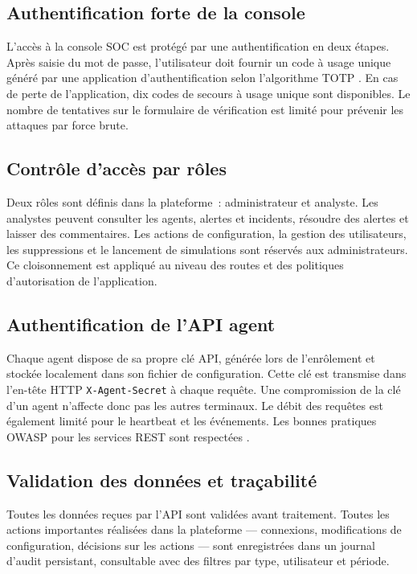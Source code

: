 \subsection{Authentification forte de la console}

L'accès à la console SOC est protégé par une authentification en deux étapes. Après saisie du mot de passe, l'utilisateur doit fournir un code à usage unique généré par une application d'authentification selon l'algorithme TOTP \cite{anssiMFA2021}. En cas de perte de l'application, dix codes de secours à usage unique sont disponibles. Le nombre de tentatives sur le formulaire de vérification est limité pour prévenir les attaques par force brute.

\subsection{Contrôle d'accès par rôles}

Deux rôles sont définis dans la plateforme~: administrateur et analyste. Les analystes peuvent consulter les agents, alertes et incidents, résoudre des alertes et laisser des commentaires. Les actions de configuration, la gestion des utilisateurs, les suppressions et le lancement de simulations sont réservés aux administrateurs. Ce cloisonnement est appliqué au niveau des routes et des politiques d'autorisation de l'application.

\subsection{Authentification de l'API agent}

Chaque agent dispose de sa propre clé API, générée lors de l'enrôlement et stockée localement dans son fichier de configuration. Cette clé est transmise dans l'en-tête HTTP \texttt{X-Agent-Secret} à chaque requête. Une compromission de la clé d'un agent n'affecte donc pas les autres terminaux. Le débit des requêtes est également limité pour le heartbeat et les événements. Les bonnes pratiques OWASP pour les services REST sont respectées \cite{owaspRestSecurity}.

\subsection{Validation des données et traçabilité}

Toutes les données reçues par l'API sont validées avant traitement. Toutes les actions importantes réalisées dans la plateforme --- connexions, modifications de configuration, décisions sur les actions --- sont enregistrées dans un journal d'audit persistant, consultable avec des filtres par type, utilisateur et période.

